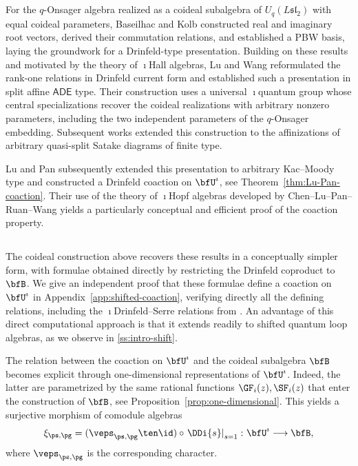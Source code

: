 \documentclass[reqno]{amsart}
\numberwithin{equation}{section}
\begin{document}
\subsection{}
For the $q$-Onsager algebra realized as a coideal subalgebra of 
$U_q(L{\mathfrak{sl}}_2)$ with equal coideal parameters, Baseilhac and Kolb 
\cite{baseilhac-kolb-20} constructed real and imaginary root vectors, derived their 
commutation relations, and established a PBW basis, laying the groundwork for a Drinfeld-type presentation. Building on these results and 
motivated by the theory of $\imath$Hall algebras, Lu and Wang \cite{lu-wang-20} 
reformulated the rank-one relations in Drinfeld current form and established such a presentation in split affine $\mathsf{ADE}$ type. Their construction 
uses a universal $\imath$quantum group whose central specializations recover the 
coideal realizations with arbitrary nonzero parameters, including the two independent 
parameters of the $q$-Onsager embedding. Subsequent works \cite{zhang-22, 
	lu-wang-zhang-23, lu-wang-zhang-24, lu-pan-wang-zhang-25} extended this 
construction to the affinizations of arbitrary quasi-split Satake diagrams of finite type.

Lu and Pan \cite{lu-pan-26} subsequently extended this presentation to arbitrary Kac--Moody type and constructed a Drinfeld coaction on $\bfU^\imath$, see Theorem~\ref{thm:Lu-Pan-coaction}. Their use of the theory of $\imath$Hopf algebras developed by Chen--Lu--Pan--Ruan--Wang \cite{chen-pan-ruan-wang-25} yields a particularly conceptual and efficient proof of the coaction property.

\subsection{}
The coideal construction above recovers these results in a conceptually simpler form, 
with formulae obtained 
directly by restricting the Drinfeld coproduct to $\bfB$. We give an independent 
proof that these formulae define a coaction on $\bfU^\imath$ in 
Appendix~\ref{app:shifted-coaction}, verifying directly all the defining 
relations, including the $\imath$Drinfeld--Serre relations from \cite{lu-pan-26}. 
An advantage of this direct computational approach is that it extends readily 
to shifted quantum loop algebras, as we observe in \ref{ss:intro-shift}.

The relation between the coaction on $\bfU^\imath$ and the coideal subalgebra 
$\bfB$ becomes explicit through one-dimensional representations of 
$\bfU^\imath$. Indeed, the latter are parametrized by the same rational functions $\GF_i(z),\SF_i(z)$ that enter the construction of $\bfB$, see Proposition~\ref{prop:one-dimensional}.
This yields a surjective morphism of comodule algebras
\begin{equation}\label{eq:intro-character-realization}
	\xi_{\ps,\pg}
	=(\veps_{\ps,\pg}\ten\id)\circ\left.\DDi{s}\right|_{s=1}
	\colon\bfU^\imath\longrightarrow\bfB,
\end{equation}
where $\veps_{\ps,\pg}$ is the corresponding character.
\end{document}
